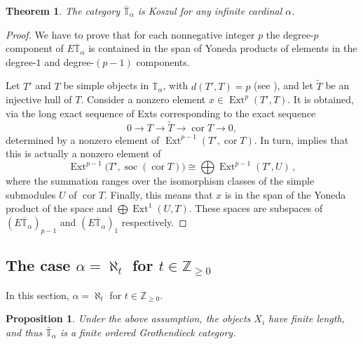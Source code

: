 \documentclass[11pt]{article}
\theoremstyle{plain}
\newtheorem{proposition}[lemma]{Proposition}
\newtheorem{theorem}[lemma]{Theorem}
\theoremstyle{nonumberplain}
\theoremstyle{plain}
\theoremstyle{nonumberplain}
\newtheorem{proof}{Proof}
\newcommand\bT{\mathbb T}
\newcommand\bZ{\mathbb Z}
\DeclareMathOperator{\ext}{\mathrm{Ext}}
\DeclareMathOperator{\cor}{\mathrm{cor}}
\DeclareMathOperator{\soc}{\mathrm{soc}}
\begin{document}
\begin{theorem}\label{th.kosz-gen}
  The category $\overline{\bT}_\alpha$ is Koszul for any infinite cardinal $\alpha$.%
\end{theorem}
\begin{proof}
  We have to prove that for each nonnegative integer $p$ the
  degree-$p$ component of $E\overline{\bT}_\alpha$ is contained in the
  span of Yoneda products of elements in the degree-$1$ and
  degree-$(p-1)$ components.
  
  Let $T'$ and $T$ be simple objects in $\bT_\alpha$, with $d(T',T)=p$
  (see ), and let $\widetilde{T}$ be an injective
  hull of $T$.  Consider a nonzero element $x\in \ext^p(T',T)$. It is obtained,
  via the long exact sequence of Exts corresponding to the exact sequence
  \begin{equation*}
    0\to T\to \widetilde{T} \to \cor T\to 0,
  \end{equation*}
  determined by a nonzero element of $\ext^{p-1}(T',\cor T)$. In turn,
   implies that this is actually a nonzero element of
  \begin{equation}\label{eq:s'u}
    \ext^{p-1}\big(T',\soc(\cor T)\big)\cong \bigoplus \ext^{p-1}(T',U)\,,
  \end{equation}
  where the summation ranges over the isomorphism classes of the simple submodules $U$ of $\cor T$.
  Finally, this means that $x$ is in the span of the Yoneda product of the space
   and $\bigoplus \ext^1(U,T)$.   These spaces are subspaces of
  $(E\overline{\bT}_\alpha)_{p-1}$ and $(E\overline{\bT}_\alpha)_1$
  respectively.
\end{proof}



\subsection{The case $\alpha=\aleph_t$ for $t\in\mathbb{Z}_{\geq 0}$}\label{subse.fin}

In this section, $\alpha=\aleph_t$ for $t\in\bZ_{\geq 0}$.

\begin{proposition}\label{prop.finordcat}
Under the above assumption, the objects $X_i$ have finite length, and thus $\bar{\bT}_{\alpha}$ is a finite ordered Grothendieck category.
\end{proposition}
\end{document}
